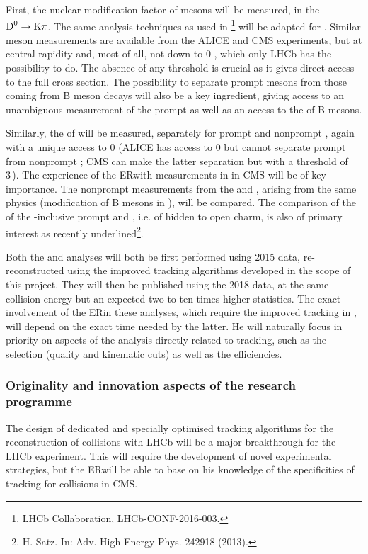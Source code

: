 \documentclass[a4paper,11pt]{article}
\newcommand{\ER}{ER}
\begin{document}
First, the nuclear modification factor of \Dz mesons will be measured, in the $\text{D}^0 \to \text{K}\pi$. The same analysis techniques as used in \pPb\footnote{LHCb Collaboration, LHCb-CONF-2016-003.} will be adapted for \pbpb. Similar \Dz meson measurements are available from the ALICE and CMS experiments, but at central rapidity and, most of all, not down to 0 \pt, which only LHCb has the possibility to do. The absence of any \pt threshold is crucial as it gives direct access to the full cross section. The possibility to separate
prompt \Dz mesons from those coming from B meson decays will also be a key ingredient, giving access to an unambiguous measurement of the prompt \Dz as well as an access to the \raa
of B mesons.

Similarly, the \raa of \Jpsi will be measured, separately for prompt and nonprompt \Jpsi, again with a unique access to 0 \pt (ALICE has access to 0 \pt \Jpsi but cannot separate prompt from nonprompt \Jpsi; CMS can make the latter separation but with a \pt threshold of 3\,\GeVc). The experience of the \ER with \Jpsi measurements in \pbpb
in CMS will be of key importance. The nonprompt measurements from the \Dz and \Jpsi, arising from the same physics (modification of B mesons in \pbpb), will be compared. The comparison of the \raa of the \pt-inclusive prompt \Jpsi and \Dz, i.e. of hidden to open charm, is also of primary interest as recently underlined\footnote{H. Satz. In: Adv. High Energy Phys. 242918 (2013).}.

Both the \Dz and \Jpsi analyses will both be first performed using 2015 \pbpb data, re-reconstructed using the improved tracking algorithms developed in the scope of this project. They will then be published using the 2018 data, at the same collision energy but an expected two to ten times higher statistics. The exact involvement of the \ER in these analyses, which require the improved tracking in \pbpb, will depend on the exact time needed by the latter. He will naturally focus in priority on aspects of the analysis directly related to tracking, such as the selection (quality and kinematic cuts) as well as the efficiencies.


\subsubsection{Originality and innovation aspects of the research programme}

The design of dedicated and specially optimised tracking algorithms for the reconstruction of \pbpb collisions with LHCb will be a major breakthrough for the LHCb experiment. This will require the development of novel experimental strategies, but the \ER will be able to base on his knowledge of the specificities of tracking for \pbpb collisions in CMS.
\end{document}
